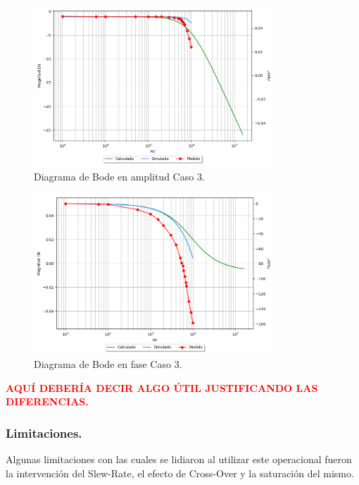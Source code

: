 \begin{figure}[H]	
	\centering
	\includegraphics[width=0.8\textwidth, trim = {0 0 2cm 0},clip]{Ejercicio1/Imagenes/BodeC3_noinv.png}
	\caption{Diagrama de Bode en amplitud Caso 3.}
	\label{fig:BodeC3_noinv}
\end{figure} 
\begin{figure}[H]	
	\centering
	\includegraphics[width=0.8\textwidth, trim = {2.2cm 0 0 0},clip]{Ejercicio1/Imagenes/BodephC3_noinv.png}
	\caption{Diagrama de Bode en fase Caso 3.}
	\label{fig:BodephC3_noinv}
\end{figure} 

\begin{center}
\textcolor{red}{\textbf{AQUÍ DEBERÍA DECIR ALGO ÚTIL JUSTIFICANDO LAS DIFERENCIAS.}}
\end{center}

\subsubsection{Limitaciones.}
Algunas limitaciones con las cuales se lidiaron al utilizar este operacional fueron la intervención del Slew-Rate, el efecto de Cross-Over y la saturación del mismo.

